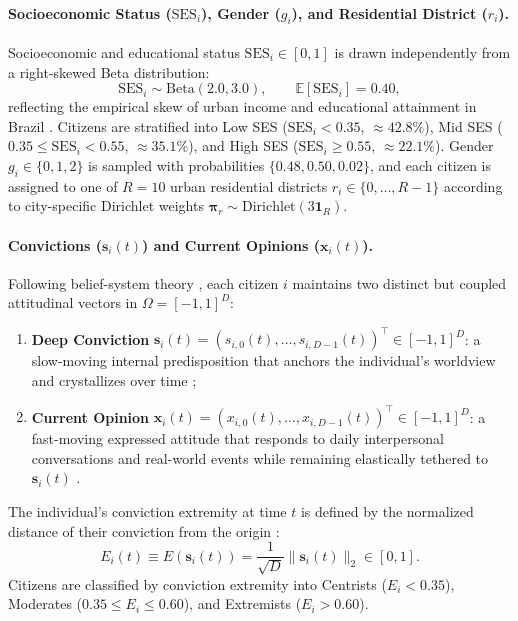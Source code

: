 \paragraph{Socioeconomic Status ($\mathrm{SES}_i$), Gender ($g_i$), and Residential District ($r_i$).}
Socioeconomic and educational status $\mathrm{SES}_i \in [0, 1]$ is drawn independently from a right-skewed Beta distribution:
\begin{equation}
    \mathrm{SES}_i \sim \mathrm{Beta}(2.0, 3.0), \qquad \mathbb{E}[\mathrm{SES}_i] = 0.40,
    \label{eq:ses_distribution}
\end{equation}
reflecting the empirical skew of urban income and educational attainment in Brazil \citep{ibge2022censo}. Citizens are stratified into Low SES ($\mathrm{SES}_i < 0.35$, $\approx 42.8\%$), Mid SES ($0.35 \le \mathrm{SES}_i < 0.55$, $\approx 35.1\%$), and High SES ($\mathrm{SES}_i \ge 0.55$, $\approx 22.1\%$). Gender $g_i \in \{0, 1, 2\}$ is sampled with probabilities $\{0.48, 0.50, 0.02\}$, and each citizen is assigned to one of $R = 10$ urban residential districts $r_i \in \{0, \dots, R-1\}$ according to city-specific Dirichlet weights $\mathbf{\pi}_r \sim \mathrm{Dirichlet}(3\mathbf{1}_R)$.

\paragraph{Convictions ($\mathbf{s}_i(t)$) and Current Opinions ($\mathbf{x}_i(t)$).}
Following belief-system theory \citep{converse1964nature, zaller1992nature, kiley2020measuring}, each citizen $i$ maintains two distinct but coupled attitudinal vectors in $\Omega = [-1, 1]^D$:
\begin{enumerate}
    \item \textbf{Deep Conviction} $\mathbf{s}_i(t) = (s_{i,0}(t), \dots, s_{i,D-1}(t))^\top \in [-1, 1]^D$: a slow-moving internal predisposition that anchors the individual's worldview and crystallizes over time \citep{friedkin1990social, alwin1991aging};
    \item \textbf{Current Opinion} $\mathbf{x}_i(t) = (x_{i,0}(t), \dots, x_{i,D-1}(t))^\top \in [-1, 1]^D$: a fast-moving expressed attitude that responds to daily interpersonal conversations and real-world events while remaining elastically tethered to $\mathbf{s}_i(t)$ \citep{zaller1992nature}.
\end{enumerate}
The individual's conviction extremity at time $t$ is defined by the normalized distance of their conviction from the origin \citep{howe2017attitude}:
\begin{equation}
    E_i(t) \equiv E(\mathbf{s}_i(t)) = \frac{1}{\sqrt{D}} \|\mathbf{s}_i(t)\|_2 \in [0, 1].
    \label{eq:conviction_extremity}
\end{equation}
Citizens are classified by conviction extremity into Centrists ($E_i < 0.35$), Moderates ($0.35 \le E_i \le 0.60$), and Extremists ($E_i > 0.60$).


